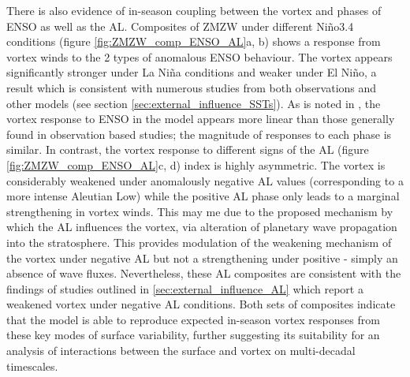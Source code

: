 There is also evidence of in-season coupling between the vortex and phases of ENSO as well as the AL. Composites of ZMZW under different Ni\~{n}o3.4 conditions (figure \ref{fig:ZMZW_comp_ENSO_AL}a, b) shows a response from vortex winds to the 2 types of anomalous ENSO behaviour. The vortex appears significantly stronger under La Ni\~{n}a conditions and weaker under El Ni\~{n}o, a result which is consistent with numerous studies from both observations and other models (see section \ref{sec:external_influence_SSTs}). As is noted in \cite{polvaniDistinguishing2017}, the vortex response to ENSO in the model appears more linear than those generally found in observation based studies; the magnitude of responses to each phase is similar. In contrast, the vortex response to different signs of the AL (figure \ref{fig:ZMZW_comp_ENSO_AL}c, d) index is highly asymmetric. The vortex is considerably weakened under anomalously negative AL values (corresponding to a more intense Aleutian Low) while the positive AL phase only leads to a marginal strengthening in vortex winds. This may me due to the proposed mechanism by which the AL influences the vortex, via alteration of planetary wave propagation into the stratosphere. This provides modulation of the weakening mechanism of the vortex under negative AL but not a strengthening under positive - simply an absence of wave fluxes. Nevertheless, these AL composites are consistent with the findings of studies outlined in \ref{sec:external_influence_AL} which report a weakened vortex under negative AL conditions. Both sets of composites indicate that the model is able to reproduce expected in-season vortex responses from these key modes of surface variability, further suggesting its suitability for an analysis of interactions between the surface and vortex on multi-decadal timescales. 

